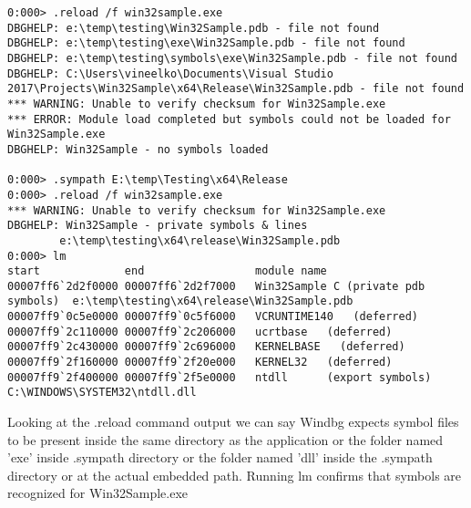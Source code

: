 \documentclass{article}
\begin{document}
\begin{verbatim}
0:000> .reload /f win32sample.exe
DBGHELP: e:\temp\testing\Win32Sample.pdb - file not found
DBGHELP: e:\temp\testing\exe\Win32Sample.pdb - file not found
DBGHELP: e:\temp\testing\symbols\exe\Win32Sample.pdb - file not found
DBGHELP: C:\Users\vineelko\Documents\Visual Studio 2017\Projects\Win32Sample\x64\Release\Win32Sample.pdb - file not found
*** WARNING: Unable to verify checksum for Win32Sample.exe
*** ERROR: Module load completed but symbols could not be loaded for Win32Sample.exe
DBGHELP: Win32Sample - no symbols loaded

0:000> .sympath E:\temp\Testing\x64\Release
0:000> .reload /f win32sample.exe
*** WARNING: Unable to verify checksum for Win32Sample.exe
DBGHELP: Win32Sample - private symbols & lines
        e:\temp\testing\x64\release\Win32Sample.pdb
0:000> lm
start             end                 module name
00007ff6`2d2f0000 00007ff6`2d2f7000   Win32Sample C (private pdb symbols)  e:\temp\testing\x64\release\Win32Sample.pdb
00007ff9`0c5e0000 00007ff9`0c5f6000   VCRUNTIME140   (deferred)
00007ff9`2c110000 00007ff9`2c206000   ucrtbase   (deferred)
00007ff9`2c430000 00007ff9`2c696000   KERNELBASE   (deferred)
00007ff9`2f160000 00007ff9`2f20e000   KERNEL32   (deferred)
00007ff9`2f400000 00007ff9`2f5e0000   ntdll      (export symbols)       C:\WINDOWS\SYSTEM32\ntdll.dll
\end{verbatim}

Looking at the .reload command output we can say Windbg expects symbol files to be present inside the same directory as the application or the folder named 'exe' inside .sympath directory or the folder named 'dll' inside the .sympath directory or at the actual embedded path. Running lm confirms that symbols are recognized for Win32Sample.exe
\end{document}

